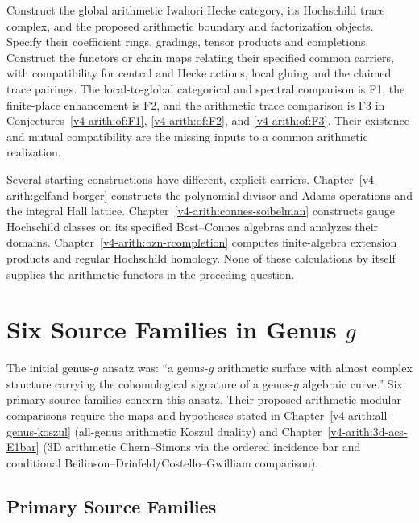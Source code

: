 \begin{question}
\label{v4-arith:app:B:comparison-construction}
Construct the global arithmetic Iwahori Hecke category, its Hochschild
trace complex, and the proposed arithmetic boundary and factorization
objects. Specify their coefficient rings, gradings, tensor products and
completions. Construct the functors or chain maps relating their
specified common carriers, with compatibility for central and Hecke
actions, local gluing and the claimed trace pairings.
The local-to-global categorical and spectral comparison is F1, the
finite-place enhancement is F2, and the arithmetic trace comparison is F3
in Conjectures~\ref{v4-arith:of:F1}, \ref{v4-arith:of:F2}, and
\ref{v4-arith:of:F3}. Their existence and mutual compatibility are the
missing inputs to a common arithmetic realization.
\end{question}

Several starting constructions have different, explicit carriers.
Chapter~\ref{v4-arith:gelfand-borger} constructs the polynomial divisor
and Adams operations and the integral Hall lattice.
Chapter~\ref{v4-arith:connes-soibelman} constructs gauge Hochschild
classes on its specified Bost--Connes algebras and analyzes their domains.
Chapter~\ref{v4-arith:bzn-rcompletion} computes finite-algebra extension
products and regular Hochschild homology. None of these calculations
by itself supplies the arithmetic functors in the preceding question.

\section{Six Source Families in Genus \(g\)}
\label{v4-arith:app:B:genus-g-session}

The initial genus-\(g\) ansatz was: ``a genus-$g$ arithmetic surface
with almost complex structure carrying the cohomological signature of a
genus-$g$ algebraic curve.'' Six primary-source families concern this ansatz. Their proposed
arithmetic-modular comparisons require the maps and hypotheses stated in
Chapter~\ref{v4-arith:all-genus-koszul} (all-genus arithmetic Koszul
duality) and Chapter~\ref{v4-arith:3d-acs-E1bar} (3D arithmetic
Chern--Simons via the ordered incidence bar and conditional
Beilinson--Drinfeld/Costello--Gwilliam comparison).

\subsection{Primary Source Families}
\label{v4-arith:app:B:genus-g:six-sources}


